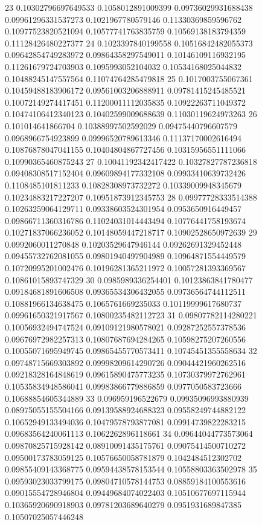 23 0.10302796697649533 0.1058012891009399 0.09736029931688438 0.09961296331537273 0.1021967780579146 0.11330369859596762 0.10977523820521094 0.10577741763835759 0.10569138183794359 0.11128426480227377
24 0.1023397840199558 0.10516842482055373 0.09642854749283972 0.09864358297549011 0.10146109116932195 0.11261679724703903 0.1095993052104032 0.10534168025044832 0.10488245147557564 0.11074764285479818
25 0.1017003755067361 0.10459488183906172 0.09561003206888911 0.09781415245485521 0.10072149274417451 0.11200011112035835 0.10922263711049372 0.10474106412340123 0.10402599009688639 0.11030119624973263
26 0.101014641866704 0.10388997502592029 0.09475440796607579 0.0968966754923899 0.09996520789613346 0.11137170002616494 0.10876878047041155 0.10404804867727456 0.10315956551111066 0.10990365460875243
27 0.10041192342417422 0.10327827787236818 0.09408308517152404 0.09609894177332108 0.09933410639732426 0.1108485101811233 0.10828308973732272 0.10339009948345679 0.10234883217227207 0.10951873912345753
28 0.09977728333514388 0.10263259064129711 0.09338603524301954 0.0953650916449457 0.09866711360316786 0.11024031014443494 0.10776441758193674 0.10271837066236052 0.10148059447218717 0.10902528650972639
29 0.0992060011270848 0.10203529647946144 0.09262691329452448 0.09455732762081055 0.09801940497904989 0.10964871554449579 0.10720995201002476 0.10196281365211972 0.10057281393369567 0.10861015893747329
30 0.0985989336254401 0.10123863841780477 0.09184681891606508 0.09365534306432055 0.09736564744112511 0.10881966134638475 0.1065761669235033 0.10119999617680737 0.09961650321917567 0.10800235482112723
31 0.09807782114280221 0.10056932494747524 0.09109121980578021 0.09287252557378536 0.09676972982257313 0.10807687694284265 0.10598275207260556 0.10055071695949745 0.09865455770573411 0.10745451355558634
32 0.09748715669303892 0.09998209614290726 0.09044421960262516 0.09218328164848619 0.09615890475773235 0.10730379972762961 0.10535834948586041 0.09983866779886859 0.0977050583723666 0.10688854605344889
33 0.096959196522679 0.09935096993880939 0.08975055155504166 0.09139588924688323 0.09558249744882122 0.10652949133494036 0.10479578793877081 0.09914739822283215 0.09683564240061113 0.1062262896118661
34 0.09644044773573064 0.09870825715928142 0.08910091435175761 0.09075414500710272 0.09500173783059125 0.10576650058781879 0.1042484512302702 0.09855409143368775 0.09594438578153544 0.10558803363502978
35 0.09593023033799175 0.09804710578144753 0.08859184100553616 0.09015554728946804 0.09449684074022403 0.10510677697115944 0.10365920690918903 0.09781203689640279 0.0951931689847385 0.10507025057446248

